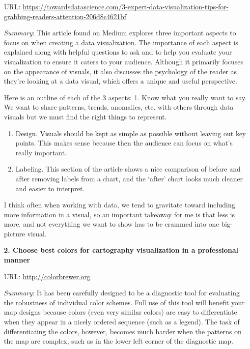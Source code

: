 \documentclass[]{book}
\theoremstyle{definition}
\theoremstyle{definition}
\theoremstyle{definition}
\theoremstyle{remark}
\begin{document}
URL:
\url{https://towardsdatascience.com/3-expert-data-visualization-tips-for-grabbing-readers-attention-206d8c4621bf}

\emph{Summary}: This article found on Medium explores three important
aspects to focus on when creating a data visualization. The importance
of each aspect is explained along with helpful questions to ask and to
help you evaluate your visualization to ensure it caters to your
audience. Although it primarily focuses on the appearance of visuals, it
also discusses the psychology of the reader as they're looking at a data
visual, which offers a unique and useful perspective.

Here is an outline of each of the 3 aspects: 1. Know what you really
want to say. We want to share patterns, trends, anomalies, etc. with
others through data visuals but we must find the right things to
represent.

\begin{enumerate}
\def\labelenumi{\arabic{enumi}.}
\setcounter{enumi}{1}
\item
  Design. Visuals should be kept as simple as possible without leaving
  out key points. This makes sense because then the audience can focus
  on what's really important.
\item
  Labeling. This section of the article shows a nice comparison of
  before and after removing labels from a chart, and the `after' chart
  looks much cleaner and easier to interpret.
\end{enumerate}

I think often when working with data, we tend to gravitate toward
including more information in a visual, so an important takeaway for me
is that less is more, and not everything we want to show has to be
crammed into one big-picture visual.

\textbf{2. Choose best colors for cartography visualization in a
professional manner}

URL: \url{http://colorbrewer.org}

\emph{Summary}: It has been carefully designed to be a diagnostic tool
for evaluating the robustness of individual color schemes. Full use of
this tool will benefit your map designs because colors (even very
similar colors) are easy to differentiate when they appear in a nicely
ordered sequence (such as a legend). The task of differentiating the
colors, however, becomes much harder when the patterns on the map are
complex, such as in the lower left corner of the diagnostic map.
\end{document}

